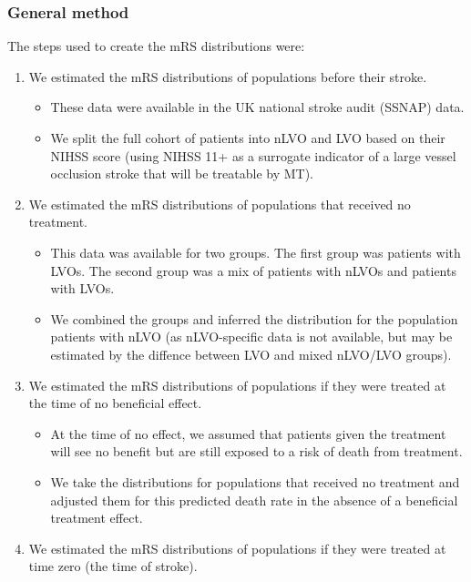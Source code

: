 \subsubsection{General method}

The steps used to create the mRS distributions were:

\begin{enumerate}
    \item We estimated the mRS distributions of populations before their stroke.
    \begin{itemize}
        \item These data were available in the UK national stroke audit (SSNAP) data.
        \item We split the full cohort of patients into nLVO and LVO based on their NIHSS score (using NIHSS 11+ as a surrogate indicator of a large vessel occlusion stroke that will be treatable by MT).
    \end{itemize}
     \item We estimated the mRS distributions of populations that received no treatment.
    \begin{itemize}
        \item This data was available for two groups. The first group was patients with LVOs. The second group was a mix of patients with nLVOs and patients with LVOs.
        \item We combined the groups and inferred the distribution for the population patients with nLVO (as nLVO-specific data is not available, but may be estimated by the diffence between LVO and mixed nLVO/LVO groups).
    \end{itemize}
        \item We estimated the mRS distributions of populations if they were treated at the time of no beneficial effect.
    \begin{itemize}
        \item At the time of no effect, we assumed that patients given the treatment will see no benefit but are still exposed to a risk of death from treatment.
    \item We take the distributions for populations that received no treatment and adjusted them for this predicted death rate in the absence of a beneficial treatment effect.
    \end{itemize}
    \item We estimated the mRS distributions of populations if they were treated at time zero (the time of stroke).
    \begin{itemize}

\end{itemize}
\end{enumerate}
